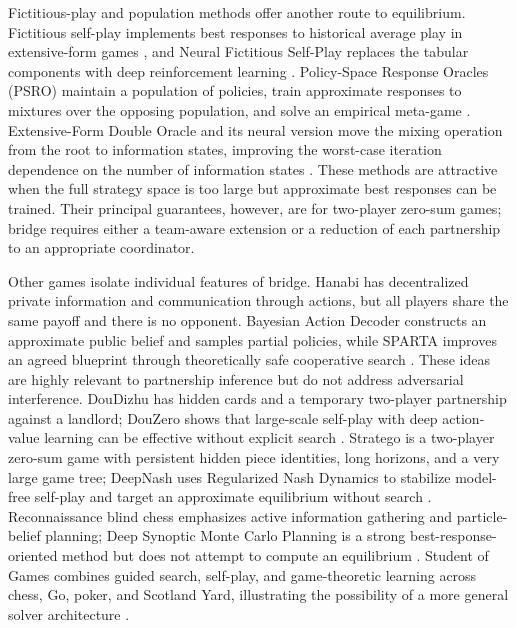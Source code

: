 \documentclass[11pt]{article}
\begin{document}
Fictitious-play and population methods offer another route to equilibrium. Fictitious self-play implements best responses to historical average play in extensive-form games \cite{heinrich2015fictitious}, and Neural Fictitious Self-Play replaces the tabular components with deep reinforcement learning \cite{heinrich2016nfsp}. Policy-Space Response Oracles (PSRO) maintain a population of policies, train approximate responses to mixtures over the opposing population, and solve an empirical meta-game \cite{lanctot2017psro}. Extensive-Form Double Oracle and its neural version move the mixing operation from the root to information states, improving the worst-case iteration dependence on the number of information states \cite{mcaleer2021xdo}. These methods are attractive when the full strategy space is too large but approximate best responses can be trained. Their principal guarantees, however, are for two-player zero-sum games; bridge requires either a team-aware extension or a reduction of each partnership to an appropriate coordinator.

Other games isolate individual features of bridge. Hanabi has decentralized private information and communication through actions, but all players share the same payoff and there is no opponent. Bayesian Action Decoder constructs an approximate public belief and samples partial policies, while SPARTA improves an agreed blueprint through theoretically safe cooperative search \cite{foerster2019bad,lerer2020sparta}. These ideas are highly relevant to partnership inference but do not address adversarial interference. DouDizhu has hidden cards and a temporary two-player partnership against a landlord; DouZero shows that large-scale self-play with deep action-value learning can be effective without explicit search \cite{zha2021douzero}. Stratego is a two-player zero-sum game with persistent hidden piece identities, long horizons, and a very large game tree; DeepNash uses Regularized Nash Dynamics to stabilize model-free self-play and target an approximate equilibrium without search \cite{perolat2022deepnash}. Reconnaissance blind chess emphasizes active information gathering and particle-belief planning; Deep Synoptic Monte Carlo Planning is a strong best-response-oriented method but does not attempt to compute an equilibrium \cite{clark2021dsmcp}. Student of Games combines guided search, self-play, and game-theoretic learning across chess, Go, poker, and Scotland Yard, illustrating the possibility of a more general solver architecture \cite{schmid2023student}.
\end{document}
